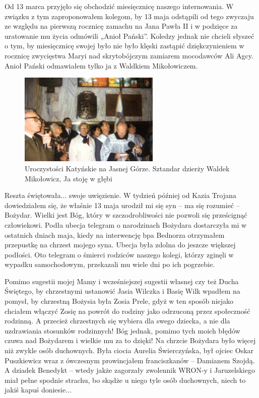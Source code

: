 Od 13 marca przyjęło się obchodzić miesięcznicę naszego internowania. W związku z tym zaproponowałem kolegom, by 13 maja odstąpili od tego zwyczaju ze względu na pierwszą rocznicę zamachu na Jana Pawła II i w podzięce za uratowanie mu życia odmówili „Anioł Pański”. Koledzy jednak nie chcieli słyszeć o tym, by miesięcznicę swojej było nie było klęski zastąpić dziękczynieniem w rocznicę zwycięstwa Maryi nad skrytobójczym zamiarem mocodawców Ali Agcy. Anioł Pański odmawiałem tylko ja z Waldkiem Mikołowiczem.
\begin{figure}[!h]
\begin{center}
\includegraphics[width=0.6\textwidth]{photo/jasna_gora_uroczytosci_katynskie.jpg}
\caption[Uroczystości Katyńskie na Jasnej Górze]{Uroczystości Katyńskie na Jasnej Górze. Sztandar dzierży Waldek Mikołowicz, Ja stoję w głębi}
\end{center}
\end{figure}

Reszta świętowała... swoje uwięzienie. W tydzień później od Kazia Trojana dowiedziałem się, że właśnie 13 maja urodził mi się syn – ma się rozumieć – Bożydar. Wielki jest Bóg, który w szczodrobliwości nie pozwoli się prześcignąć człowiekowi. Podła ubecja telegram o narodzinach Bożydara dostarczyła mi w ostatnich dniach maja, kiedy na interwencję bpa Bednorza otrzymałem przepustkę na chrzest mojego syna. Ubecja była zdolna do jeszcze większej podłości. Oto telegram o śmierci rodziców naszego kolegi, którzy zginęli w wypadku samochodowym, przekazali mu wiele dni po ich pogrzebie.

Pomimo sugestii mojej Mamy i wcześniejszej sugestii własnej czy też Ducha Świętego, by chrzestnymi ustanowić Jasia Wilczka i Basię Wilk wpadłem na pomysł, by chrzestną Bożysia była Zosia Prele, gdyż w ten sposób niejako chciałem włączyć Zosię na powrót do rodziny jako odrzuconą przez społeczność rodzinną. A przecież chrzestnych się wybiera dla swego dziecka, a nie dla uzdrawiania stosunków rodzinnych! Bóg jednak, pomimo tych moich błędów czuwa nad Bożydarem i wielkie mu za to dzięki! Na chrzcie Bożydara było więcej niż zwykle osób duchownych. Była ciocia Aurelia Świerczyńska, był ojciec Oskar Puszkiewicz wraz z ówczesnym prowincjałem franciszkanów – Damianem Szojdą. A dziadek Benedykt – wtedy jakże zagorzały zwolennik WRON-y i Jaruzelskiego miał pełne spodnie strachu, bo skądże u niego tyle osób duchownych, niech to jakiś kapuś doniesie...

